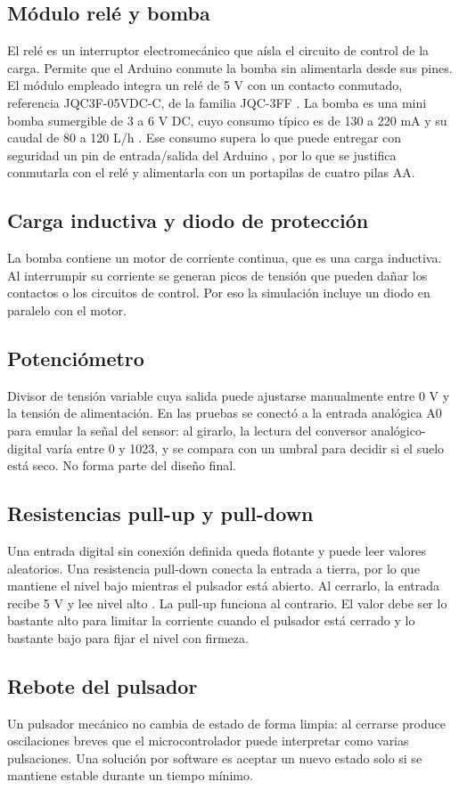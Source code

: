 \documentclass[conference]{IEEEtran}
\begin{document}
\subsection{Módulo relé y bomba}
El relé es un interruptor electromecánico que aísla el circuito de control de la carga. Permite que el Arduino conmute la bomba sin alimentarla desde sus pines. El módulo empleado integra un relé de 5 V con un contacto conmutado, referencia JQC3F-05VDC-C, de la familia JQC-3FF \cite{rele}. La bomba es una mini bomba sumergible de 3 a 6 V DC, cuyo consumo típico es de 130 a 220 mA y su caudal de 80 a 120 L/h \cite{bomba}. Ese consumo supera lo que puede entregar con seguridad un pin de entrada/salida del Arduino \cite{arduino}, por lo que se justifica conmutarla con el relé y alimentarla con un portapilas de cuatro pilas AA.
\subsection{Carga inductiva y diodo de protección}
La bomba contiene un motor de corriente continua, que es una carga inductiva. Al interrumpir su corriente se generan picos de tensión que pueden dañar los contactos o los circuitos de control. Por eso la simulación incluye un diodo en paralelo con el motor.
\subsection{Potenciómetro}
Divisor de tensión variable cuya salida puede ajustarse manualmente entre 0 V y la tensión de alimentación. En las pruebas se conectó a la entrada analógica A0 para emular la señal del sensor: al girarlo, la lectura del conversor analógico-digital varía entre 0 y 1023, y se compara con un umbral para decidir si el suelo está seco. No forma parte del diseño final.
\subsection{Resistencias pull-up y pull-down}
Una entrada digital sin conexión definida queda flotante y puede leer valores aleatorios. Una resistencia pull-down conecta la entrada a tierra, por lo que mantiene el nivel bajo mientras el pulsador está abierto. Al cerrarlo, la entrada recibe 5 V y lee nivel alto \cite{arduino}. La pull-up funciona al contrario. El valor debe ser lo bastante alto para limitar la corriente cuando el pulsador está cerrado y lo bastante bajo para fijar el nivel con firmeza.
\subsection{Rebote del pulsador}
Un pulsador mecánico no cambia de estado de forma limpia: al cerrarse produce oscilaciones breves que el microcontrolador puede interpretar como varias pulsaciones. Una solución por software es aceptar un nuevo estado solo si se mantiene estable durante un tiempo mínimo.
\end{document}
